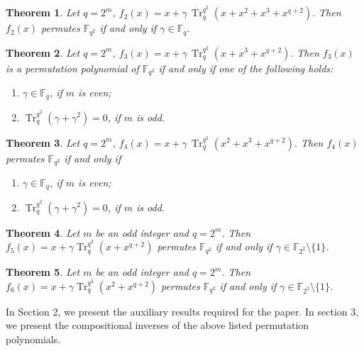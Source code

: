 \documentclass{birkjour}
\newtheorem{thm}{Theorem}[section]
\theoremstyle{definition}
\theoremstyle{remark}
\numberwithin{equation}{section}
\begin{document}
\begin{thm}\cite{JIANG2025102522}
	Let $q = 2^m$, 
	\(
	f_2(x) = x + \gamma \, \operatorname{Tr}_{q}^{q^2}(x + x^2 + x^3 + x^{q+2}).
	\)
	Then $f_2(x)$ permutes $\mathbb{F}_{q^2}$ if and only if $\gamma \in \mathbb{F}_q$.
\end{thm}

\begin{thm}\cite{JIANG2025102522}
	Let $q = 2^m$, 
	\(
	f_3(x) = x + \gamma \, \operatorname{Tr}_{q}^{q^2}(x + x^3 + x^{q+2}).
	\)
	Then $f_3(x)$ is a permutation polynomial of $\mathbb{F}_{q^2}$ if and only if one of the following holds:
	\begin{enumerate}
		\item[(a)] $\gamma \in \mathbb{F}_q$, if $m$ is even;
		\item[(b)] $\operatorname{Tr}_{q}^{q^2}(\gamma + \gamma^2) = 0$, if $m$ is odd.
	\end{enumerate}
\end{thm}

\begin{thm}\cite{JIANG2025102522}
	Let $q = 2^m$, 
	\(
	f_4(x) = x + \gamma \, \operatorname{Tr}_{q}^{q^2}(x^2 + x^3 + x^{q+2}).
	\)
	Then $f_4(x)$ permutes $\mathbb{F}_{q^2}$ if and only if
	\begin{enumerate}
		\item[(a)] $\gamma \in \mathbb{F}_q$, if $m$ is even;
		\item[(b)] $\operatorname{Tr}_{q}^{q^2}(\gamma + \gamma^2) = 0$, if $m$ is odd.
	\end{enumerate}
\end{thm}

\begin{thm}\cite{JIANG2025102522}
	Let $m$ be an odd integer and $q = 2^m$. Then $f_5(x) = x + \gamma\operatorname{Tr}_q^{q^2}(x + x^{q+2})$
	permutes $\mathbb{F}_{q^2}$ if and only if $\gamma \in \mathbb{F}_{2^2} \setminus\{1\}$.
\end{thm}
\begin{thm}\cite{JIANG2025102522}
	Let $m$ be an odd integer and $q = 2^m$. Then $f_6(x) = x + \gamma \operatorname{Tr}_q^{q^2}(x^2 + x^{q+2})$
	permutes $\mathbb{F}_{q^2}$ if and only if $\gamma \in \mathbb{F}_{2^2} \setminus\{1\}$.
\end{thm}	
	
	
In Section 2, we present the auxiliary results required for the paper. In section 3, we present the compositional inverses of the above listed permutation polynomials.
	
\end{document}
